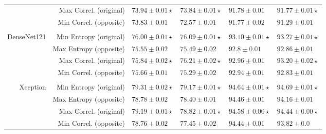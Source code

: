 \documentclass{elsarticle}
\begin{document}
\begin{table}[h]
\begin{tabularx}{\textwidth}{rr|YY|YY}
			                  &  Max Correl. (original) & $\mathbf{73.94\pm0.01\star}$  & $\mathbf{73.84\pm0.01\star}$ & $\mathbf{91.78\pm0.01}$       & $\mathbf{91.77\pm0.01\star}$      \\
			                  &  Min Correl. (opposite) & $73.83\pm0.01$                & $72.57\pm0.01	$              & $91.77\pm0.02$                     & $91.29\pm0.01$                    \\
			                  &                         &                               &                              &                                    &                                   \\
			   { DenseNet121} & Min Entropy  (original) & $\mathbf{76.00\pm0.01\star}$  & $\mathbf{76.09\pm0.01\star}$ & $\mathbf{93.10\pm0.01\star}$       & $\mathbf{93.27\pm0.01\star}$      \\
			                  & Max Entropy  (opposite) & $75.55\pm0.02$                & $75.49\pm0.02$               & $92.8\pm0.01$                      & $92.86\pm0.01$                    \\
			                  &  Max Correl. (original) & $\mathbf{75.84\pm0.02\star}$  & $\mathbf{76.21\pm0.02\star}$ & $\mathbf{92.96\pm0.01}$       & $\mathbf{93.20\pm0.02\star}$      \\
			                  & Min Correl.  (opposite) & $75.66\pm0.01$                & $75.29\pm0.02$               & $92.94\pm0.01$                     & $92.83\pm0.01$                    \\
			                  &                         &                               &                              &                                    &                                   \\
			      { Xception} & Min Entropy  (original) & $\mathbf{79.31\pm0.02\star}$  & $\mathbf{79.17\pm0.01\star}$ & $\mathbf{94.64\pm0.01\star}$       & $\mathbf{94.69\pm0.01\star}$      \\
			                  & Max Entropy  (opposite) & $78.78\pm0.02$                & $78.40\pm0.01$               & $94.46\pm0.01$                     & $94.16\pm0.01$                    \\
			                  & Max Correl.  (original) & $\mathbf{79.19\pm0.01\star}$  & $\mathbf{78.82\pm0.01\star}$ & $\mathbf{94.58\pm0.00\star}$       & $\mathbf{94.44\pm0.00\star}$      \\
			                  & Min Correl.  (opposite) & $78.76\pm0.02$                & $77.45\pm0.02$               & $94.44\pm0.01$                     & $93.82\pm0.0$                     \\ \bottomrule
		\end{tabularx}
		\label{tab:results2}
	\end{table}
	
\end{document}
